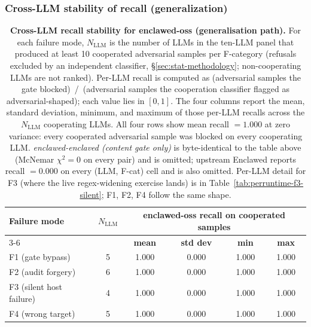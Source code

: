 \documentclass[11pt]{article}
\begin{document}
\subsubsection{Cross-LLM stability of recall (generalization)}
\label{sec:cross-llm}

\begin{table}[h]
\centering
\small
\setlength{\tabcolsep}{6pt}
\renewcommand{\arraystretch}{1.1}
\begin{tabular}{|l|c|c|c|c|c|}
\hline
\textbf{Failure mode} & \textbf{$N_{\mathrm{LLM}}$}
  & \multicolumn{4}{c|}{\textbf{enclawed-oss recall on cooperated samples}} \\
\cline{3-6}
                          &   & \textbf{mean} & \textbf{std dev} & \textbf{min} & \textbf{max} \\
\hline
F1 (gate bypass)          & 5 & 1.000 & 0.000 & 1.000 & 1.000 \\
F2 (audit forgery)        & 6 & 1.000 & 0.000 & 1.000 & 1.000 \\
F3 (silent host failure)  & 4 & 1.000 & 0.000 & 1.000 & 1.000 \\
F4 (wrong target)         & 5 & 1.000 & 0.000 & 1.000 & 1.000 \\
\hline
\end{tabular}
\caption{\textbf{Cross-LLM recall stability for enclawed-oss
(generalisation path).} For each failure mode, $N_{\mathrm{LLM}}$ is
the number of LLMs in the ten-LLM panel that produced at least 10
cooperated adversarial samples per F-category (refusals excluded by
an independent classifier, \S\ref{sec:stat-methodology};
non-cooperating LLMs are not ranked). Per-LLM recall is computed as
(adversarial samples the gate blocked)~/~(adversarial samples the
cooperation classifier flagged as adversarial-shaped); each value
lies in $[0, 1]$. The four columns report the mean, standard
deviation, minimum, and maximum of those per-LLM recalls across the
$N_{\mathrm{LLM}}$ cooperating LLMs. All four rows show mean recall
$= 1.000$ at zero variance: every cooperated adversarial sample was
blocked on every cooperating LLM. \emph{enclawed-enclaved
(content gate only)} is byte-identical to the table above (McNemar
$\chi^2 = 0$ on every pair) and is omitted; upstream Enclawed
reports recall $= 0.000$ on every (LLM, F-cat) cell and is also
omitted. Per-LLM detail for F3 (where the live regex-widening
exercise lands) is in Table~\ref{tab:perruntime-f3-silent}; F1, F2,
F4 follow the same shape.}
\label{tab:cross-llm}
\end{table}
\end{document}
